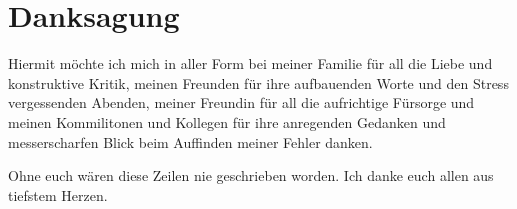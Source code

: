 \section*{Danksagung}
\noindent
Hiermit möchte ich mich in aller Form bei meiner Familie für all die Liebe und konstruktive Kritik, meinen Freunden für ihre aufbauenden Worte und den Stress vergessenden Abenden, meiner Freundin für all die aufrichtige Fürsorge und meinen Kommilitonen und Kollegen für ihre anregenden Gedanken und messerscharfen Blick beim Auffinden meiner Fehler danken.

\noindent
Ohne euch wären diese Zeilen nie geschrieben worden. Ich danke euch allen aus tiefstem Herzen.